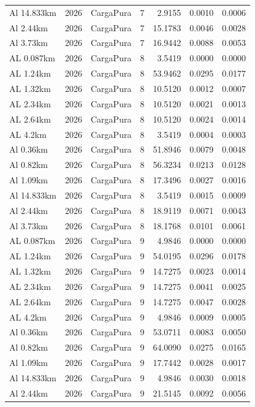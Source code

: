 \documentclass[11pt,a4paper]{article}
\begin{document}
\begin{longtable}{llllrrr}
Al 14.833km & 2026 & CargaPura & 7 & 2.9155 & 0.0010 & 0.0006 \\
Al 2.44km & 2026 & CargaPura & 7 & 15.1783 & 0.0046 & 0.0028 \\
Al 3.73km & 2026 & CargaPura & 7 & 16.9442 & 0.0088 & 0.0053 \\
AL 0.087km & 2026 & CargaPura & 8 & 3.5419 & 0.0000 & 0.0000 \\
AL 1.24km & 2026 & CargaPura & 8 & 53.9462 & 0.0295 & 0.0177 \\
AL 1.32km & 2026 & CargaPura & 8 & 10.5120 & 0.0012 & 0.0007 \\
AL 2.34km & 2026 & CargaPura & 8 & 10.5120 & 0.0021 & 0.0013 \\
AL 2.64km & 2026 & CargaPura & 8 & 10.5120 & 0.0024 & 0.0014 \\
AL 4.2km & 2026 & CargaPura & 8 & 3.5419 & 0.0004 & 0.0003 \\
Al 0.36km & 2026 & CargaPura & 8 & 51.8946 & 0.0079 & 0.0048 \\
Al 0.82km & 2026 & CargaPura & 8 & 56.3234 & 0.0213 & 0.0128 \\
Al 1.09km & 2026 & CargaPura & 8 & 17.3496 & 0.0027 & 0.0016 \\
Al 14.833km & 2026 & CargaPura & 8 & 3.5419 & 0.0015 & 0.0009 \\
Al 2.44km & 2026 & CargaPura & 8 & 18.9119 & 0.0071 & 0.0043 \\
Al 3.73km & 2026 & CargaPura & 8 & 18.1768 & 0.0101 & 0.0061 \\
AL 0.087km & 2026 & CargaPura & 9 & 4.9846 & 0.0000 & 0.0000 \\
AL 1.24km & 2026 & CargaPura & 9 & 54.0195 & 0.0296 & 0.0178 \\
AL 1.32km & 2026 & CargaPura & 9 & 14.7275 & 0.0023 & 0.0014 \\
AL 2.34km & 2026 & CargaPura & 9 & 14.7275 & 0.0041 & 0.0025 \\
AL 2.64km & 2026 & CargaPura & 9 & 14.7275 & 0.0047 & 0.0028 \\
AL 4.2km & 2026 & CargaPura & 9 & 4.9846 & 0.0009 & 0.0005 \\
Al 0.36km & 2026 & CargaPura & 9 & 53.0711 & 0.0083 & 0.0050 \\
Al 0.82km & 2026 & CargaPura & 9 & 64.0090 & 0.0275 & 0.0165 \\
Al 1.09km & 2026 & CargaPura & 9 & 17.7442 & 0.0028 & 0.0017 \\
Al 14.833km & 2026 & CargaPura & 9 & 4.9846 & 0.0030 & 0.0018 \\
Al 2.44km & 2026 & CargaPura & 9 & 21.5145 & 0.0092 & 0.0056 \\

\end{longtable}
\end{document}
